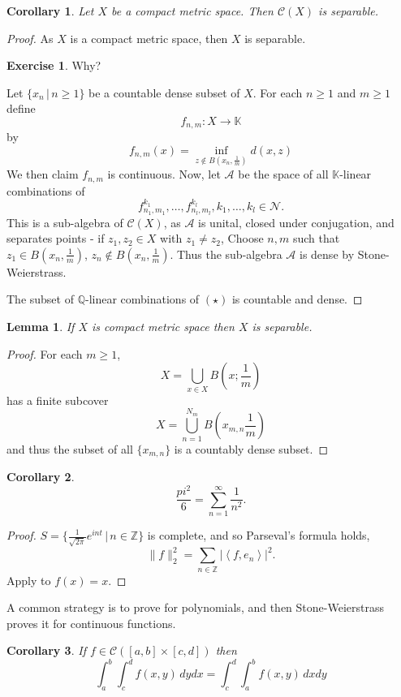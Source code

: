 \documentclass[10pt, oneside, reqno]{amsart}
\theoremstyle{plain}%
\newtheorem{lem}[thm]{Lemma}
\newtheorem*{cor}{Corollary}
\theoremstyle{definition}
\newtheorem{exer}[thm]{Exercise}
\theoremstyle{remark}
\newcommand{\given}{ \, | \,}
\newcommand{\Q}{\mathbb{Q}}
\newcommand{\K}{\mathbb{K}}
\newcommand{\Z}{\mathbb{Z}}
\newcommand{\iprod}[1]{\left\langle #1 \right\rangle}
\begin{document}
\begin{cor}
	Let $X$ be a compact metric space.  Then $\mathcal C(X)$ is separable.
\end{cor}
\begin{proof}
	As $X$ is a compact metric space, then $X$ is separable.  
	\begin{exer}
		Why?
	\end{exer}
	Let $\{ x_n \given n \geq 1 \}$ be a countable dense subset of $X$.  For each $n \geq 1$ and $m \geq 1$ define \[
		f_{n,m} : X \rightarrow \K
	\] by \[f_{n,m}(x) = \inf_{z \notin B(x_n, \frac{1}{m})} d(x,z)\]
	We then claim $f_{n,m}$ is continuous.  Now, let $\mathcal{A}$ be the space of all $\K$-linear combinations of \begin{equation*}
		f^{k_1}_{n_1,m_1}, \dots, f_{n_l, m_l}^{k_l}, k_1, \dots, k_l \in \mathcal{N}. \tag{$\star$}
	\end{equation*}
 This is a sub-algebra of $\mathcal C(X)$, as $\mathcal A$ is unital, closed under conjugation, and separates points - if $z_1, z_2 \in X$ with $z_1 \neq z_2$, Choose $n,m$ such that $z_1 \in B(x_n, \frac{1}{m})$, $z_n \notin B(x_n, \frac{1}{m})$.  Thus the sub-algebra $\mathcal A$ is dense by Stone-Weierstrass.  
	
	The subset of $\Q$-linear combinations of $(\star)$ is countable and dense.
\end{proof}

\begin{lem}
	If $X$ is compact metric space then $X$ is separable.  
\end{lem}
\begin{proof}
	For each $m \geq 1$, \[
		X = \bigcup_{x \in X} B(x ; \frac{1}{m})
	\]  has a finite subcover \[
		X = \bigcup_{n=1}^{N_m} B(x_{m,n} \frac{1}{m})
	\] and thus the subset of all $\{x_{m,n} \}$ is a countably dense subset. 
\end{proof}

\begin{cor}
	\[
	\frac{pi^2}{6} = \sum_{n = 1}^\infty \frac{1}{n^2}.
	\] 
\end{cor}

\begin{proof}
	$S = \{ \frac{1}{\sqrt{2 \pi}} e^{i nt } \given n \in \Z \}$ is complete, and so Parseval's formula holds, \[
		\| f \|_2^2 = \sum_{ n \in \Z} | \iprod{f, e_n} |^2.
	\]  Apply to $f(x) = x$.  
\end{proof}

A common strategy is to prove for polynomials, and then Stone-Weierstrass proves it for continuous functions.  
\begin{cor}
	If $ f \in \mathcal C([a,b] \times [c,d])$ then \[
		\int_a^b \int_c^d f(x,y) \, dy dx = \int_c^d \int_a^b f(x,y) \, dx dy
	\]
\end{cor}
\end{document}
